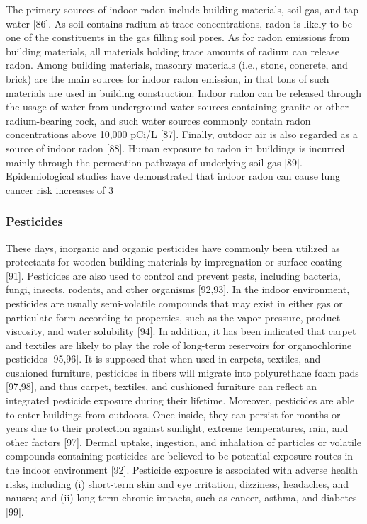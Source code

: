 \cite{ijerph17238972}


The primary sources of indoor radon include building materials, soil gas, and tap water [86]. As soil contains radium at trace concentrations, radon is likely to be one of the constituents in the gas filling soil pores. As for radon emissions from building materials, all materials holding trace amounts of radium can release radon. Among building materials, masonry materials (i.e., stone, concrete, and brick) are the main sources for indoor radon emission, in that tons of such materials are used in building construction. Indoor radon can be released through the usage of water from underground water sources containing granite or other radium-bearing rock, and such water sources commonly contain radon concentrations above 10,000 pCi/L [87]. Finally, outdoor air is also regarded as a source of indoor radon [88]. Human exposure to radon in buildings is incurred mainly through the permeation pathways of underlying soil gas [89]. Epidemiological studies have demonstrated that indoor radon can cause lung cancer risk increases of 3%

\cite{ijerph17238972}

\subsubsection{Pesticides}

These days, inorganic and organic pesticides have commonly been utilized as protectants for wooden building materials by impregnation or surface coating [91]. Pesticides are also used to control and prevent pests, including bacteria, fungi, insects, rodents, and other organisms [92,93]. In the indoor environment, pesticides are usually semi-volatile compounds that may exist in either gas or particulate form according to properties, such as the vapor pressure, product viscosity, and water solubility [94]. In addition, it has been indicated that carpet and textiles are likely to play the role of long-term reservoirs for organochlorine pesticides [95,96]. It is supposed that when used in carpets, textiles, and cushioned furniture, pesticides in fibers will migrate into polyurethane foam pads [97,98], and thus carpet, textiles, and cushioned furniture can reflect an integrated pesticide exposure during their lifetime. Moreover, pesticides are able to enter buildings from outdoors. Once inside, they can persist for months or years due to their protection against sunlight, extreme temperatures, rain, and other factors [97]. Dermal uptake, ingestion, and inhalation of particles or volatile compounds containing pesticides are believed to be potential exposure routes in the indoor environment [92]. Pesticide exposure is associated with adverse health risks, including (i) short-term skin and eye irritation, dizziness, headaches, and nausea; and (ii) long-term chronic impacts, such as cancer, asthma, and diabetes [99].

